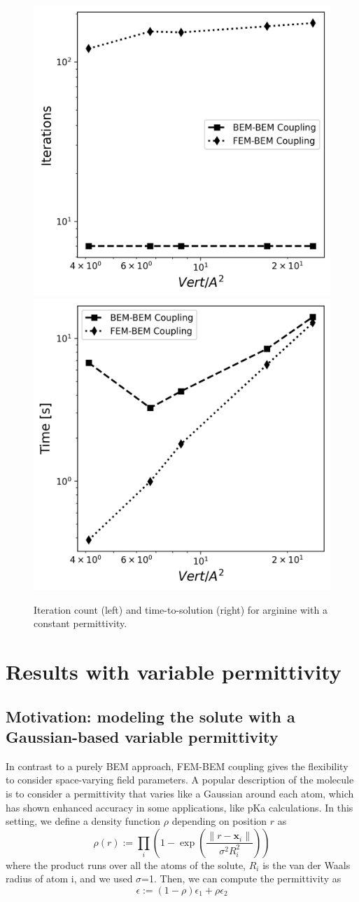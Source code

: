 \begin{figure}
\centering
   \includegraphics[width=0.45\linewidth]{DolfinX_Arginine2_const_coeff_iter.png}
  \includegraphics[width=0.45\linewidth]{DolfinX_Arginine2_const_coeff_total_time.png}
  \caption{Iteration count (left) and time-to-solution (right) for arginine with a constant permittivity.  }
\label{fig:arg2_constant_time_iter}
\end{figure}


\section*{\sffamily \Large Results with variable permittivity}

\subsection*{\sffamily \large Motivation: modeling the solute with a Gaussian-based variable permittivity}

In contrast to a purely BEM approach, FEM-BEM coupling gives the flexibility to consider space-varying field parameters. 
A popular description of the molecule is to consider a permittivity that varies like a Gaussian around each atom,\cite{grant2001smooth} which has shown enhanced accuracy in some applications, like pKa calculations.\cite{li2013dielectric}
In this setting, we define a density function $\rho$ depending on position $r$ as
%
\begin{equation}
\rho(r) := \prod_i \left(1 - \exp{\left(\frac{\|r-\mathbf{x}_i\|}{\sigma^2 R_i^2}\right)}\right)
\end{equation}
%
where the product runs over all the atoms of the solute, $R_i$ is the van der Waals radius of atom i, and we used $\sigma$=1. Then, we can compute the permittivity as
%
\begin{equation}\label{eq:varying_eps}
\epsilon := \left(1-\rho \right) \epsilon_1 + \rho\epsilon_2
\end{equation}

